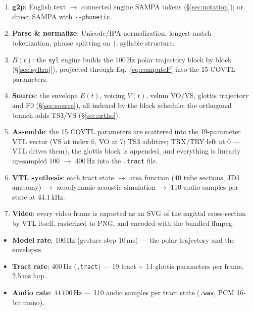 \documentclass[11pt,a4paper]{article}
\begin{document}
\begin{enumerate}[leftmargin=1.5em]
\item \textbf{g2p}: English text \(\to\) connected engine SAMPA tokens
      (\S\ref{sec:notation}); or direct SAMPA with
      \texttt{-{}-phonetic}.
\item \textbf{Parse \& normalize}: Unicode/IPA normalization, longest-match
      tokenization, phrase splitting on \texttt{|}, syllable structure.
\item \textbf{\(B(t)\)}: the \texttt{syl} engine builds the 100\,Hz polar
      trajectory block by block (\S\ref{sec:syltraj}), projected through
      Eq.~\eqref{eq:computeP} into the 15 COVTL parameters.
\item \textbf{Source}: the envelope \(E(t)\), voicing \(V(t)\), velum
      VO/VS, glottis trajectory and F0 (\S\ref{sec:source}), all indexed
      by the block schedule; the orthogonal branch adds TS3/VS
      (\S\ref{sec:ortho}).
\item \textbf{Assemble}: the 15 COVTL parameters are scattered into the
      19-parameter VTL vector (VS at index 6, VO at 7; TS3 additive;
      TRX/TRY left at 0 --- VTL drives them), the glottis block is
      appended, and everything is linearly up-sampled 100
      \(\to\) 400\,Hz into the \texttt{.tract} file.
\item \textbf{VTL synthesis}: each tract state \(\to\) area function
      (40 tube sections, JD3 anatomy) \(\to\) aerodynamic-acoustic
      simulation \(\to\) 110 audio samples per state at 44.1\,kHz.
\item \textbf{Video}: every video frame is exported as an SVG of the
      sagittal cross-section by VTL itself, rasterized to PNG, and
      encoded with the bundled ffmpeg.
\end{enumerate}

\begin{callout}
\begin{itemize}[leftmargin=1.5em]
\item \textbf{Model rate}: 100\,Hz (gesture step 10\,ms) --- the polar
      trajectory and the envelopes.
\item \textbf{Tract rate}: 400\,Hz (\texttt{.tract}) --- 19 tract + 11
      glottis parameters per frame, 2.5\,ms hop.
\item \textbf{Audio rate}: \(44\,100\,\mathrm{Hz}\) --- 110 audio samples
      per tract state (\texttt{.wav}, PCM 16-bit mono).
\end{itemize}
\end{callout}
\end{document}

